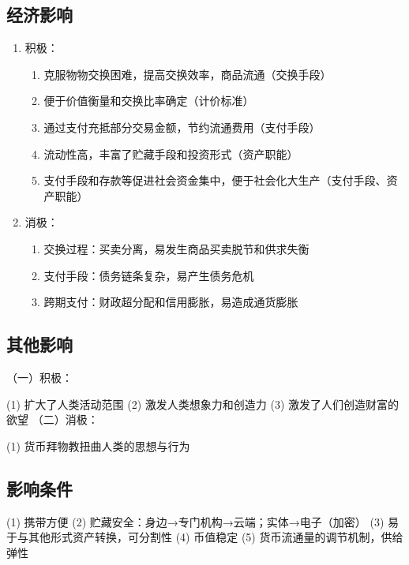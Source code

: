 \documentclass[12pt]{book}
\begin{document}
\subsection{经济影响}

\begin{enumerate}[1.]
    \item 积极：
          \begin{enumerate}[(1)]
              \item 克服物物交换困难，提高交换效率，商品流通（交换手段）
              \item 便于价值衡量和交换比率确定（计价标准）
              \item 通过支付充抵部分交易金额，节约流通费用（支付手段）
              \item 流动性高，丰富了贮藏手段和投资形式（资产职能）
              \item 支付手段和存款等促进社会资金集中，便于社会化大生产（支付手段、资产职能）
          \end{enumerate}
    \item 消极：
          \begin{enumerate}[(1)]
              \item 交换过程：买卖分离，易发生商品买卖脱节和供求失衡
              \item 支付手段：债务链条复杂，易产生债务危机
              \item 跨期支付：财政超分配和信用膨胀，易造成通货膨胀
          \end{enumerate}
\end{enumerate}



\subsection{其他影响}
（一）积极：

(1) 扩大了人类活动范围
(2) 激发人类想象力和创造力
(3) 激发了人们创造财富的欲望
（二）消极：

(1) 货币拜物教扭曲人类的思想与行为


\subsection{影响条件}
(1) 携带方便
(2) 贮藏安全：身边→专门机构→云端；实体→电子（加密）
(3) 易于与其他形式资产转换，可分割性
(4) 币值稳定
(5) 货币流通量的调节机制，供给弹性
\end{document}
